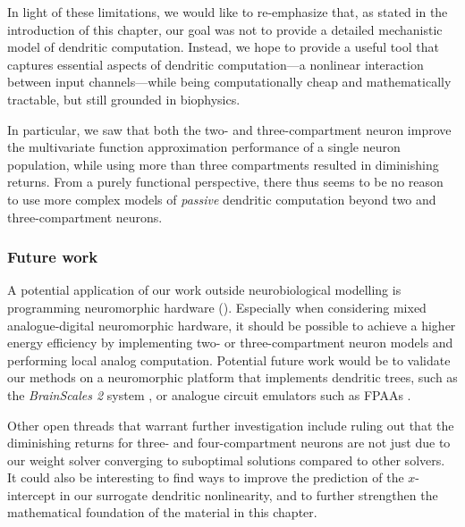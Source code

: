 In light of these limitations, we would like to re-emphasize that, as stated in the introduction of this chapter, our goal was not to provide a detailed mechanistic model of dendritic computation.
Instead, we hope to provide a useful tool that captures essential aspects of dendritic computation---a nonlinear interaction between input channels---while being computationally cheap and mathematically tractable, but still grounded in biophysics.

In particular, we saw that both the two- and three-compartment neuron improve the multivariate function approximation performance of a single neuron population, while using more than three compartments resulted in diminishing returns.
From a purely functional perspective, there thus seems to be no reason to use more complex models of \emph{passive} dendritic computation beyond two and three-compartment neurons.

\subsubsection{Future work}
A potential application of our work outside neurobiological modelling is programming neuromorphic hardware ().
Especially when considering mixed analogue-digital neuromorphic hardware, it should be possible to achieve a higher energy efficiency by implementing two- or three-compartment neuron models and performing local analog computation.
Potential future work would be to validate our methods on a neuromorphic platform that implements dendritic trees, such as the \emph{BrainScales 2} system \citep{schemmel2017accelerated}, or analogue circuit emulators such as FPAAs \citep[e.g.,][]{george2016programmable}.

Other open threads that warrant further investigation include ruling out that the diminishing returns for three- and four-compartment neurons are not just due to our weight solver converging to suboptimal solutions compared to other solvers.
It could also be interesting to find ways to improve the prediction of the $x$-intercept in our surrogate dendritic nonlinearity, and to further strengthen the mathematical foundation of the material in this chapter.
